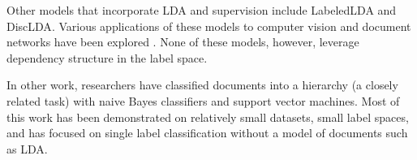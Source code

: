 
Other models that incorporate LDA and supervision include
LabeledLDA\citep{Ramage2009} and DiscLDA\citep{DiscLDA}.  Various applications of these models to 
computer vision and document networks have been explored \citep{wangbleifeifei08,RelationalLDA} . 
None of these models, however, leverage dependency structure in the label space.

In other work, researchers have classified documents into a hierarchy (a closely related task) with naive Bayes classifiers
and support vector machines. Most of this work has been demonstrated on relatively
small datasets, small label spaces, and has focused on single label classification without
a model of documents such as LDA\citep{mccallum99building,Dumais2000HCW,Kollerilprints291,Chakrabarti1998SFS}.


